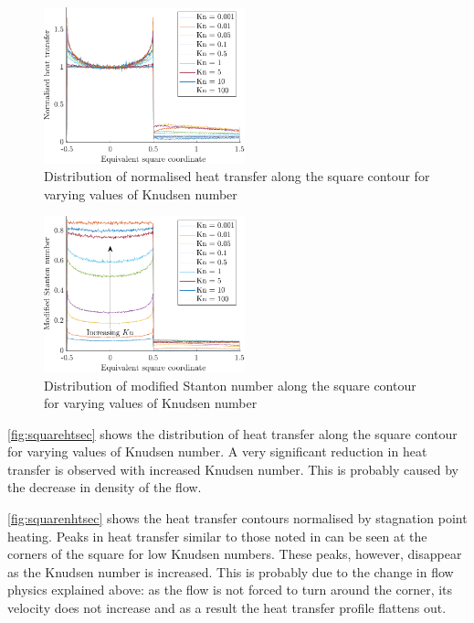 \begin{figure}
    \centering
    \includegraphics[width=0.52\textwidth]{Images/4. Results/Square Kn/nhtsec.pdf}
    \caption{Distribution of normalised heat transfer along the square contour for varying values of Knudsen number}
    \label{fig:squarenhtsec}
\end{figure}

\begin{figure}
    \centering
    \includegraphics[width=0.52\textwidth]{Images/4. Results/Square Kn/stsec.pdf}
    \caption{Distribution of modified Stanton number along the square contour for varying values of Knudsen number}
    \label{fig:squarestsec}
\end{figure}

\autoref{fig:squarehtsec} shows the distribution of heat transfer along the square contour for varying values of Knudsen number. A very significant reduction in heat transfer is observed with increased Knudsen number. This is probably caused by the decrease in density of the flow.

\autoref{fig:squarenhtsec} shows the heat transfer contours normalised by stagnation point heating. Peaks in heat transfer similar to those noted in \cite{rees} can be seen at the corners of the square for low Knudsen numbers. These peaks, however, disappear as the Knudsen number is increased. This is probably due to the change in flow physics explained above: as the flow is not forced to turn around the corner, its velocity does not increase and as a result the heat transfer profile flattens out.

